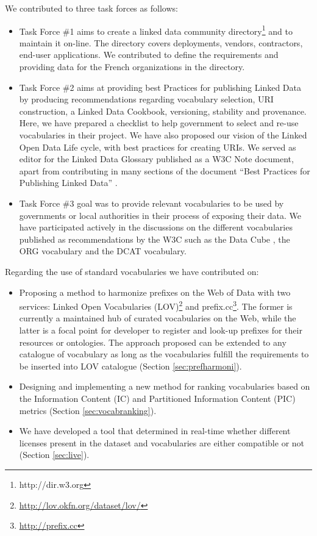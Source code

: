 We contributed to three task forces as follows:
\begin{itemize}
 \item Task Force \#1 aims to create a linked data community directory\footnote{http://dir.w3.org} and to maintain it on-line. The directory covers deployments, vendors, contractors, end-user applications. We contributed to define the requirements and providing data for the French organizations in the directory.
 \item Task Force \#2 aims at providing best Practices for publishing Linked Data by producing recommendations regarding vocabulary selection, URI construction, a Linked Data Cookbook, versioning, stability and provenance. Here, we have prepared a checklist to help government to select and re-use vocabularies in their project. We have also proposed our vision of the Linked Open Data Life cycle, with best practices for creating URIs. We served as editor for the Linked Data Glossary \cite{glossairegld} published as a W3C Note document, apart from contributing in many sections of the document ``Best Practices for Publishing Linked Data'' \cite{bpgld}.
 \item Task Force \#3 goal was to provide relevant vocabularies to be used by governments or local authorities in their process of exposing their data. We have participated actively in the discussions on the different vocabularies published as recommendations by the W3C such as the Data Cube \cite{dcube}, the ORG vocabulary \cite{org} and the DCAT \cite{dcat} vocabulary.
\end{itemize}

Regarding the use of standard vocabularies we have contributed on:
\begin{itemize}
 \item  Proposing a method to harmonize prefixes on the Web of Data  with two services: Linked Open Vocabularies (LOV)\footnote{\url{http://lov.okfn.org/dataset/lov/}} and prefix.cc\footnote{\url{http://prefix.cc}}. The former is currently a maintained hub of curated vocabularies on the Web, while the latter is a focal point for developer to register and look-up prefixes for their resources or ontologies. The approach proposed can be extended to any catalogue of vocabulary as long as the vocabularies fulfill the requirements to be inserted into LOV catalogue (Section \ref{sec:prefharmoni}).
 \item  Designing and implementing a new method for ranking vocabularies based on the Information Content (IC) and Partitioned Information Content (PIC) metrics (Section \ref{sec:vocabranking}).
 \item We have developed a tool that determined in real-time whether different licenses present in the dataset and vocabularies are either compatible or not (Section \ref{sec:live}).
\end{itemize}


